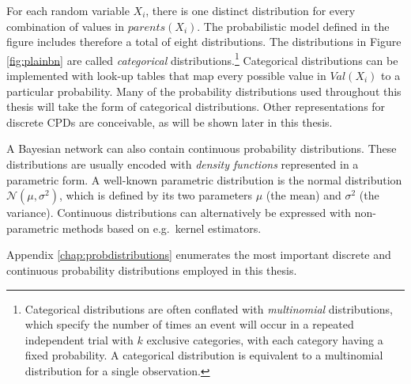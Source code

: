 
For each random variable $X_i$, there is one distinct distribution for every combination of values in $\mathit{parents}(X_i)$. The probabilistic model defined in the figure includes therefore a total of eight distributions.  The distributions in Figure \ref{fig:plainbn} are called \textit{categorical} distributions.\footnote{Categorical distributions are often conflated with \textit{multinomial} distributions, which specify the number of times an event will occur in a repeated independent trial with $k$ exclusive categories, with each category having a fixed probability.  A categorical distribution is equivalent to a multinomial distribution for a single observation.} Categorical distributions can be implemented with look-up tables that map every possible value in $\mathit{Val}(X_i)$ to a particular probability.  Many of the probability distributions used throughout this thesis will take the form of categorical distributions. Other representations for discrete CPDs are conceivable, as will be shown later in this thesis.

A Bayesian network can also contain continuous probability distributions.  These distributions are usually encoded with \textit{density functions} represented in a parametric form.  A well-known parametric distribution is the normal distribution $\mathcal{N}(\mu,\sigma^2)$, which is defined by its two parameters $\mu$ (the mean) and $\sigma^2$ (the variance). Continuous distributions can alternatively be expressed with non-parametric methods based on e.g.\ kernel estimators.


Appendix \ref{chap:probdistributions} enumerates the most important discrete and continuous probability distributions employed in this thesis.  %

